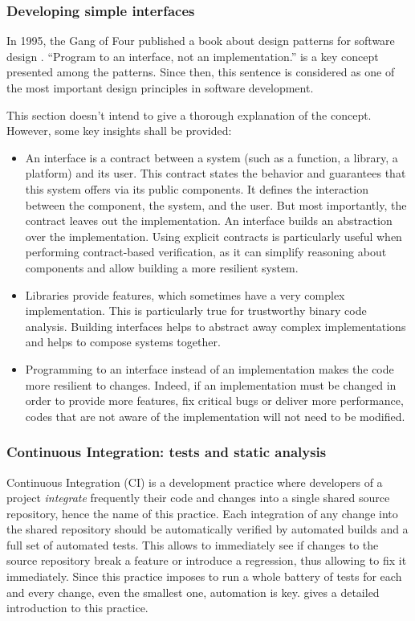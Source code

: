\documentclass[10pt,a4paper]{article}
\begin{document}
\begin{multicols}{2}
\subsubsection{Developing simple interfaces}

In 1995, the Gang of Four published a book about design patterns for software design \cite{gamma_design_1995}. ``Program to an interface, not an implementation.'' is a key concept presented among the patterns. Since then, this sentence is considered as one of the most important design principles in software development.

This section doesn't intend to give a thorough explanation of the concept. However, some key insights shall be provided:

\begin{itemize}
    \item An interface is a contract between a system (such as a function, a library, a platform) and its user. This contract states the behavior and guarantees that this system offers via its public components. It defines the interaction between the component, the system, and the user. But most importantly, the contract leaves out the implementation. An interface builds an abstraction over the implementation. Using explicit contracts is particularly useful when performing contract-based verification, as it can simplify reasoning about components and allow building a more resilient system.
    \item Libraries provide features, which sometimes have a very complex implementation. This is particularly true for trustworthy binary code analysis. Building interfaces helps to abstract away complex implementations and helps to compose systems together.
    \item Programming to an interface instead of an implementation makes the code more resilient to changes. Indeed, if an implementation must be changed in order to provide more features, fix critical bugs or deliver more performance, codes that are not aware of the implementation will not need to be modified.
\end{itemize}

\subsubsection{Continuous Integration: tests and static analysis}

Continuous Integration ({CI}) is a development practice where developers of a project \textit{integrate} frequently their code and changes into a single shared source repository, hence the name of this practice. Each integration of any change into the shared repository should be automatically verified by automated builds and a full set of automated tests. This allows to immediately see if changes to the source repository break a feature or introduce a regression, thus allowing to fix it immediately. Since this practice imposes to run a whole battery of tests for each and every change, even the smallest one, automation is key. \cite{martin_fowler_continuous_nodate} gives a detailed introduction to this practice.


\end{multicols}
\end{document}
